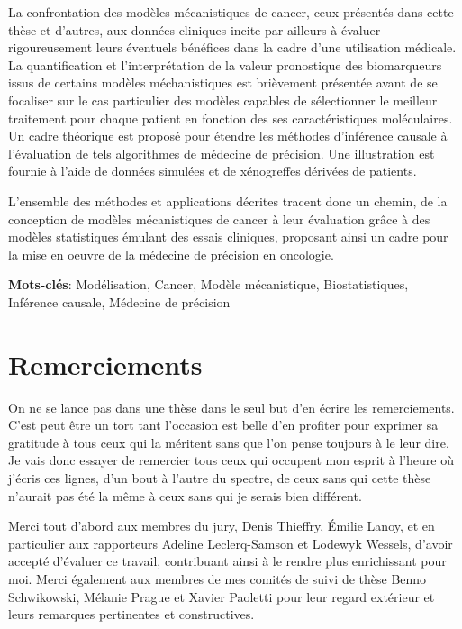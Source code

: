 \documentclass[a4paper,12pt,twoside,onecolumn,openright,final,oldfontcommands]{memoir}
\newcommand{\initial}[1]{
	\lettrine[lines=3,lhang=0.33,nindent=0em]{
		\color{gray}
     		{\textsc{#1}}}{}}
\newcommand\blankpage{%
    \null
    \thispagestyle{empty}%
    \newpage
    }
\begin{document}
La confrontation des modèles mécanistiques de cancer, ceux présentés
dans cette thèse et d'autres, aux données cliniques incite par ailleurs
à évaluer rigoureusement leurs éventuels bénéfices dans la cadre d'une
utilisation médicale. La quantification et l'interprétation de la valeur
pronostique des biomarqueurs issus de certains modèles méchanistiques
est brièvement présentée avant de se focaliser sur le cas particulier
des modèles capables de sélectionner le meilleur traitement pour chaque
patient en fonction des ses caractéristiques moléculaires. Un cadre
théorique est proposé pour étendre les méthodes d'inférence causale à
l'évaluation de tels algorithmes de médecine de précision. Une
illustration est fournie à l'aide de données simulées et de xénogreffes
dérivées de patients.

L'ensemble des méthodes et applications décrites tracent donc un chemin,
de la conception de modèles mécanistiques de cancer à leur évaluation
grâce à des modèles statistiques émulant des essais cliniques, proposant
ainsi un cadre pour la mise en oeuvre de la médecine de précision en
oncologie.

\vspace{\baselineskip}

\textbf{Mots-clés}: Modélisation, Cancer, Modèle mécanistique,
Biostatistiques, Inférence causale, Médecine de précision

\afterpage{\blankpage}

\chapter*{Remerciements}

\initial{O}n ne se lance pas dans une thèse dans le seul but d'en écrire
les remerciements. C'est peut être un tort tant l'occasion est belle
d'en profiter pour exprimer sa gratitude à tous ceux qui la méritent
sans que l'on pense toujours à le leur dire. Je vais donc essayer de
remercier tous ceux qui occupent mon esprit à l'heure où j'écris ces
lignes, d'un bout à l'autre du spectre, de ceux sans qui cette thèse
n'aurait pas été la même à ceux sans qui je serais bien différent.

Merci tout d'abord aux membres du jury, Denis Thieffry, Émilie Lanoy, et
en particulier aux rapporteurs Adeline Leclerq-Samson et Lodewyk
Wessels, d'avoir accepté d'évaluer ce travail, contribuant ainsi à le
rendre plus enrichissant pour moi. Merci également aux membres de mes
comités de suivi de thèse Benno Schwikowski, Mélanie Prague et Xavier
Paoletti pour leur regard extérieur et leurs remarques pertinentes et
constructives.
\end{document}

